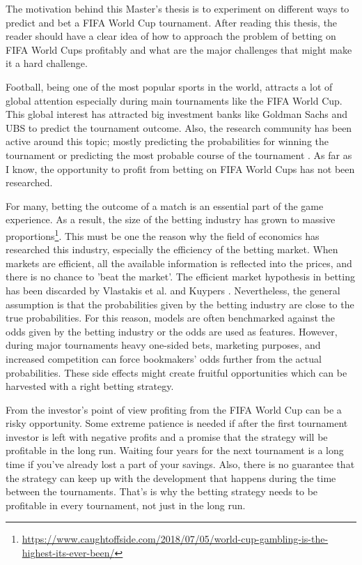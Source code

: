 The motivation behind this Master's thesis is to experiment on different ways to predict and bet a FIFA World Cup tournament. After reading this thesis, the reader should have a clear idea of how to approach the problem of betting on FIFA World Cups profitably and what are the major challenges that might make it a hard challenge.

Football, being one of the most popular sports in the world, attracts a lot of global attention especially during main tournaments like the FIFA World Cup. This global interest has attracted big investment banks like Goldman Sachs and UBS to predict the tournament outcome. Also, the research community has been active around this topic; mostly predicting the probabilities for winning the tournament or predicting the most probable course of the tournament \cite{groll2018prediction, groll2015prediction, leitner2010forecasting}. As far as I know, the opportunity to profit from betting on FIFA World Cups has not been researched.

For many, betting the outcome of a match is an essential part of the game experience. As a result, the size of the betting industry has grown to massive proportions\footnote{\url{https://www.caughtoffside.com/2018/07/05/world-cup-gambling-is-the-highest-its-ever-been/}}. This must be one the reason why the field of economics has researched this industry, especially the efficiency of the betting market. When markets are efficient, all the available information is reflected into the prices, and there is no chance to 'beat the market'. The efficient market hypothesis in betting has been discarded by Vlastakis et al. \cite{vlastakis2009efficient} and Kuypers \cite{kuypers2008}. Nevertheless, the general assumption is that the probabilities given by the betting industry are close to the true probabilities. For this reason, models are often benchmarked against the odds given by the betting industry or the odds are used as features. \cite{leitner2010forecasting} However, during major tournaments heavy one-sided bets, marketing purposes, and increased competition can force bookmakers' odds further from the actual probabilities. These side effects might create fruitful opportunities which can be harvested with a right betting strategy.

From the investor's point of view profiting from the FIFA World Cup can be a risky opportunity. Some extreme patience is needed if after the first tournament investor is left with negative profits and a promise that the strategy will be profitable in the long run. Waiting four years for the next tournament is a long time if you've already lost a part of your savings. Also, there is no guarantee that the strategy can keep up with the development that happens during the time between the tournaments. That's is why the betting strategy needs to be profitable in every tournament, not just in the long run.

